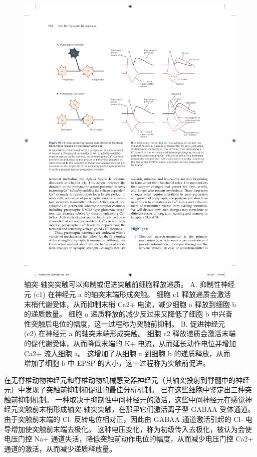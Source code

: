\begin{figure}[htbp]
	\centering
	\includegraphics[width=0.85\linewidth]{chap15/fig_15_16}
	\caption{轴突-轴突突触可以抑制或促进突触前细胞释放递质。 A. 抑制性神经元 (c1) 在神经元 a 的轴突末端形成突触。 细胞 c1 释放递质会激活末梢代谢受体，从而抑制末梢 Ca2+ 电流，减少细胞 a 释放到细胞 b 的递质数量。 细胞 a 递质释放的减少反过来又降低了细胞 b 中兴奋性突触后电位的幅度，这一过程称为突触前抑制。 B. 促进神经元 (c2) 在神经元 a 的轴突末端形成突触。 细胞 c2 释放递质会激活末端的促代谢受体，从而降低末端的 K+ 电流，从而延长动作电位并增加 Ca2+ 流入细胞 a。 这增加了从细胞 a 到细胞 b 的递质释放，从而增加了细胞 b 中 EPSP 的大小，这一过程称为突触前促进。}
	\label{fig:15_16}
\end{figure}



在无脊椎动物神经元和脊椎动物机械感受器神经元（其轴突投射到脊髓中的神经元）中发现了突触前抑制和促进的最佳分析机制。
已在这些细胞中鉴定出三种突触前抑制机制。
一种取决于抑制性中间神经元的激活，这些中间神经元在感觉神经元突触前末梢形成轴突-轴突突触，在那里它们激活离子型 GABAA 受体通道。
由于突触前末端的 Cl- 反转电位相对正，因此由 GABAA 通道激活引起的 Cl- 电导增加使突触前末端去极化。
这种电压变化，称为初级传入去极化，被认为会使电压门控 Na+ 通道失活，降低突触前动作电位的幅度，从而减少电压门控 Ca2+ 通道的激活，从而减少递质释放量。


